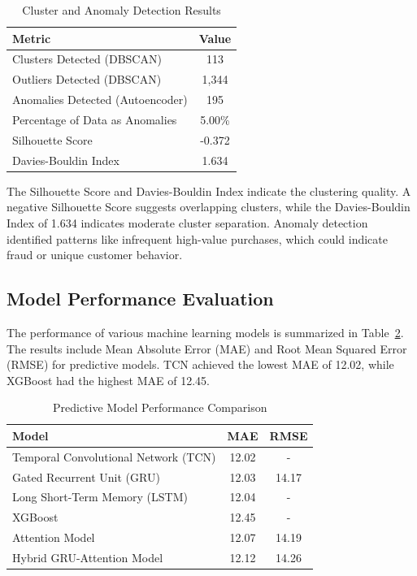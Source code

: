 \documentclass[12pt, a4paper,twoside]{report}
\theoremstyle{plain} %
\theoremstyle{definition} %
\theoremstyle{remark} %
\numberwithin{equation}{chapter}
\begin{document}
\begin{table}[h!]
\centering
\caption{Cluster and Anomaly Detection Results}
\label{tab:clustering}
\begin{tabular}{|l|c|}
\hline
\textbf{Metric} & \textbf{Value} \\ \hline
Clusters Detected (DBSCAN) & 113 \\ \hline
Outliers Detected (DBSCAN) & 1,344 \\ \hline
Anomalies Detected (Autoencoder) & 195 \\ \hline
Percentage of Data as Anomalies & 5.00\% \\ \hline
Silhouette Score & -0.372 \\ \hline
Davies-Bouldin Index & 1.634 \\ \hline
\end{tabular}
\end{table}

The Silhouette Score and Davies-Bouldin Index indicate the clustering quality. A negative Silhouette Score suggests overlapping clusters, while the Davies-Bouldin Index of 1.634 indicates moderate cluster separation. Anomaly detection identified patterns like infrequent high-value purchases, which could indicate fraud or unique customer behavior.

\subsection{Model Performance Evaluation}

The performance of various machine learning models is summarized in Table~\ref{tab:model_performance}. The results include Mean Absolute Error (MAE) and Root Mean Squared Error (RMSE) for predictive models. TCN achieved the lowest MAE of 12.02, while XGBoost had the highest MAE of 12.45.

\begin{table}[h!]
\centering
\caption{Predictive Model Performance Comparison}
\label{tab:model_performance}
\begin{tabular}{|l|c|c|}
\hline
\textbf{Model} & \textbf{MAE} & \textbf{RMSE} \\ \hline
Temporal Convolutional Network (TCN) & 12.02 & - \\ \hline
Gated Recurrent Unit (GRU) & 12.03 & 14.17 \\ \hline
Long Short-Term Memory (LSTM) & 12.04 & - \\ \hline
XGBoost & 12.45 & - \\ \hline
Attention Model & 12.07 & 14.19 \\ \hline
Hybrid GRU-Attention Model & 12.12 & 14.26 \\ \hline
\end{tabular}
\end{table}
\end{document}
